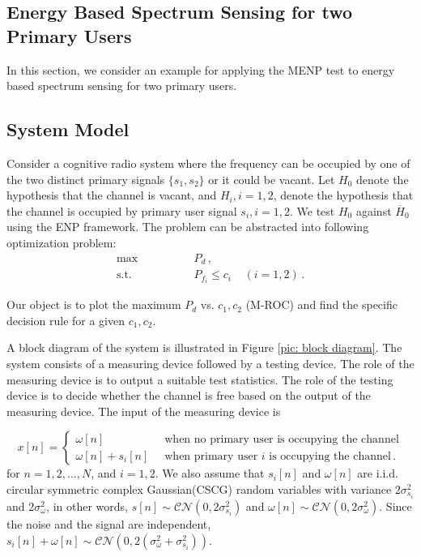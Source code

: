 \documentclass[12pt,journal,a4paper,twoside,onecolumn]{IEEEtran}
\begin{document}
\begin{spacing}{2.5}
\section{Energy Based Spectrum Sensing for two Primary Users}
In this section, we consider an example for applying the MENP test to energy based spectrum sensing for two primary users.

\subsection{System Model}
Consider a cognitive radio system where the frequency can be occupied by one of the two  distinct primary signals $\{ s_1, s_2 \}$ or it could be vacant.
Let  $H_0$  denote the hypothesis that the channel is vacant, and $H_i, i = 1, 2$, denote the hypothesis that the channel is occupied by primary user signal $s_i, i=1, 2$. We test $H_0$ against $\overline{H}_0$ using the ENP framework. The problem can be abstracted into following optimization problem:
\begin{equation}
  \label{equ: energy spectrum sensing}
  \begin{split}
  \max \;\;\;\;\;\;\;\;\;\;\;\;\;\;\; &P_d\,,\\
  \text{s.t.} \;\;\;\;\;\;\;\;\;\;\;\;\;\;\; &P_{f_i} \leq c_i\;\;\;\;(i = 1, 2)\,.
  \end{split}
\end{equation}

Our object is to plot the maximum $P_d$ vs. $c_1, c_2$ (M-ROC) and find the specific decision rule for a given $c_1, c_2$.

A block diagram of the system is illustrated in Figure \ref{pic: block diagram}. The system consists of a measuring device followed by a testing device. The role of the measuring device is to output a suitable test statistics. The role of the testing device is to decide whether the channel is free based on the output of the measuring device. The input of the measuring device is

\begin{equation}
  \label{equ: expression of x}
  x[n]=\begin{cases}
    \omega[n]\;\;\;\;\;\;\;\;\;\;\;\;\;\;&\text{when no primary user is occupying the channel}\\
    \omega[n] + s_i[n]\;\;&\text{when primary user $i$ is occupying the channel}\,.
  \end{cases}
\end{equation}
for $n = 1, 2, ..., N$, and $i = 1, 2$. We also assume that $s_i[n]$ and $\omega[n]$ are i.i.d. circular symmetric complex Gaussian(CSCG) random variables with variance $2\sigma_{s_i}^2$ and $2\sigma_{\omega}^2$, in other words, $s[n] \sim \mathcal{CN}(0, 2\sigma_{s_i}^2) $ and $\omega[n] \sim \mathcal{CN}(0, 2\sigma_\omega^2)$. Since the noise and the signal are independent, $s_i[n] + \omega[n] \sim \mathcal{CN}(0, 2(\sigma_\omega^2 + \sigma_{s_i}^2))$.


\end{spacing}
\end{document}
